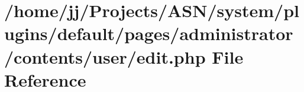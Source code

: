 \hypertarget{system_2plugins_2default_2pages_2administrator_2contents_2user_2edit_8php}{}\section{/home/jj/\+Projects/\+A\+S\+N/system/plugins/default/pages/administrator/contents/user/edit.php File Reference}
\label{system_2plugins_2default_2pages_2administrator_2contents_2user_2edit_8php}
